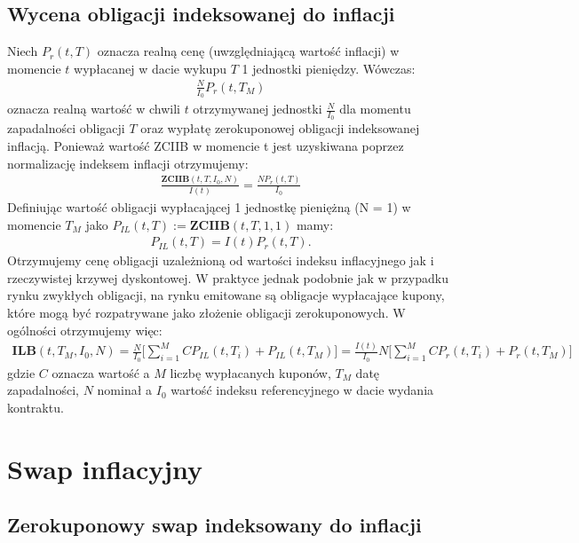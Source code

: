 \documentclass{mini}
\theoremstyle{mythstyle}
\begin{document}
	\subsection*{Wycena obligacji indeksowanej do inflacji}
		Niech $P_r(t,T)$ oznacza realną cenę (uwzględniającą wartość inflacji) w momencie $t$ wypłacanej w dacie wykupu $T$ 1 jednostki pieniędzy. Wówczas:
	\begin{eqnarray}
		\frac{N}{I_0} P_r(t,T_M) 
	\end{eqnarray}
	oznacza realną wartość w chwili $t$ otrzymywanej jednostki $\frac{N}{I_0}$ dla momentu zapadalności obligacji $T$ oraz wypłatę zerokuponowej obligacji indeksowanej inflacją. Ponieważ wartość ZCIIB w momencie t jest uzyskiwana poprzez normalizację indeksem inflacji otrzymujemy:
	\begin{eqnarray}
		 \frac{\mathbf{ZCIIB}(t,T,I_0,N)}{I(t)} = \frac{N P_r(t,T)}{I_0} 
	 \end{eqnarray}
	Definiując wartość obligacji wypłacającej 1 jednostkę pieniężną (N = 1) w momencie $T_M$ jako $P_{IL}(t,T) := \mathbf{ZCIIB}(t,T,1,1)$ mamy:
	\begin{eqnarray}
		P_{IL}(t,T) = I(t) P_r(t,T).
	\end{eqnarray}
	Otrzymujemy cenę obligacji uzależnioną od wartości indeksu inflacyjnego jak i rzeczywistej krzywej dyskontowej. 
	W praktyce jednak podobnie jak w przypadku rynku zwykłych obligacji, na rynku emitowane są obligacje wypłacające kupony, które mogą być rozpatrywane jako złożenie obligacji zerokuponowych. W ogólności otrzymujemy więc:
	\begin{eqnarray*}
		\mathbf{ILB}(t,T_M,I_0,N) = \frac{N}{I_0} \bigg[ \sum_{i=1}^M C P_{IL}(t,T_i) + P_{IL}(t,T_M)\bigg]
									 = \frac{I(t)}{I_0}N \bigg[ \sum_{i=1}^M C P_{r}(t,T_i) + P_{r}(t,T_M)\bigg]
	\end{eqnarray*}
	gdzie $C$ oznacza wartość a $M$ liczbę wypłacanych kuponów, $T_M$ datę zapadalności, $N$ nominał a $I_0$ wartość indeksu referencyjnego w dacie wydania kontraktu.
		
	\section{Swap inflacyjny}
		
	\subsection{Zerokuponowy swap indeksowany do inflacji}
		
\end{document}

